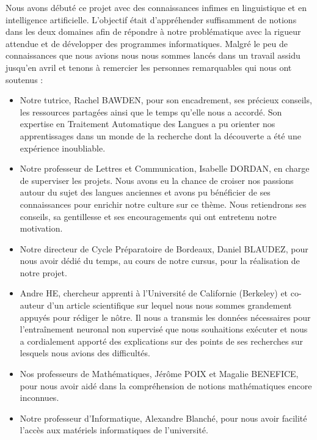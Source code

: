 \documentclass[12pt, twoside]{report}
\begin{document}
Nous avons débuté ce projet avec des connaissances infimes en linguistique et en intelligence artificielle. L’objectif était d’appréhender suffisamment de notions dans les deux domaines afin de répondre à notre problématique avec la rigueur attendue et de développer des programmes informatiques. Malgré le peu de connaissances que nous avions nous nous sommes lancés dans un travail assidu jusqu'en avril et tenons à remercier les personnes remarquables qui nous ont soutenus :
\begin{itemize}
    \item Notre tutrice, Rachel BAWDEN, pour son encadrement, ses précieux conseils, les ressources partagées ainsi que le temps qu’elle nous a accordé. Son expertise en Traitement Automatique des Langues a pu orienter nos apprentissages dans un monde de la recherche dont la découverte a été une expérience inoubliable.\\
    \item Notre professeur de Lettres et Communication, Isabelle DORDAN, en charge de superviser les projets. Nous avons eu la chance de croiser nos passions autour du sujet des langues anciennes et avons pu bénéficier de ses connaissances pour enrichir notre culture sur ce thème. Nous retiendrons ses conseils, sa gentillesse et ses encouragements qui ont entretenu notre motivation.\\
    \item Notre directeur de Cycle Préparatoire de Bordeaux, Daniel BLAUDEZ, pour nous avoir dédié du temps, au cours de notre cursus, pour la réalisation de notre projet.\\
    \item Andre HE, chercheur apprenti à l’Université de Californie (Berkeley) et co-auteur d’un article scientifique sur lequel nous nous sommes grandement appuyés pour rédiger le nôtre. Il nous a transmis les données nécessaires pour l’entraînement neuronal non supervisé que nous souhaitions exécuter et nous a cordialement apporté des explications sur des points de ses recherches sur lesquels nous avions des difficultés.\\
    \item Nos professeurs de Mathématiques, Jérôme POIX et Magalie BENEFICE, pour nous avoir aidé dans la compréhension de notions mathématiques encore inconnues.\\
    \item Notre professeur d’Informatique, Alexandre Blanché, pour nous avoir facilité l’accès aux matériels informatiques de l’université.\\
\end{itemize}
\end{document}

